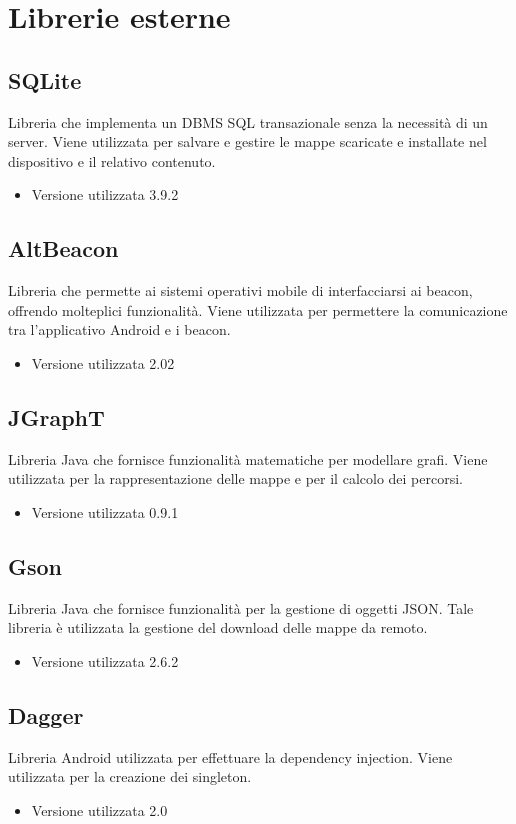 \documentclass[../ManualeSviluppatore.tex]{subfiles}
\begin{document}
\section{Librerie esterne}
	
	\subsection{SQLite}
		Libreria che implementa un DBMS SQL transazionale senza la necessità di un server. Viene utilizzata per salvare e gestire le mappe scaricate e installate nel dispositivo e il relativo contenuto.
		\begin{itemize} \item Versione utilizzata 3.9.2\end{itemize}

	\subsection{AltBeacon}
		Libreria che permette ai sistemi operativi mobile di interfacciarsi ai \gls{beacon}, offrendo molteplici funzionalità. Viene utilizzata per permettere la comunicazione tra l'applicativo \gls{Android} e i \gls{beacon}.
		\begin{itemize} \item Versione utilizzata 2.02\end{itemize}
		
	\subsection{JGraphT}
		Libreria \gls{Java} che fornisce funzionalità matematiche per modellare grafi. Viene utilizzata per la rappresentazione delle mappe e per il calcolo dei percorsi. 
		\begin{itemize} \item Versione utilizzata 0.9.1\end{itemize}

	\subsection{Gson}
		Libreria \gls{Java} che fornisce funzionalità per la gestione di oggetti JSON. Tale libreria è utilizzata la gestione del download delle mappe da remoto. 
		\begin{itemize} \item Versione utilizzata 2.6.2\end{itemize}

	\subsection{Dagger}
		Libreria \gls{Android} utilizzata per effettuare la dependency injection. Viene utilizzata per la creazione dei singleton.
		\begin{itemize} \item Versione utilizzata 2.0\end{itemize}
\end{document}
